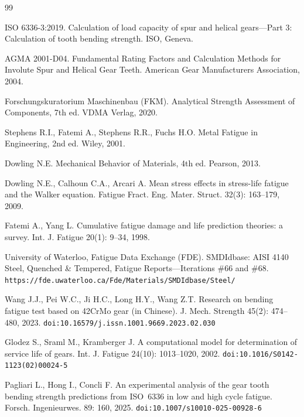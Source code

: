 \documentclass[12pt,a4paper]{article}
\begin{document}
\begin{thebibliography}{99}

ISO 6336-3:2019. Calculation of load capacity of spur and helical
gears---Part 3: Calculation of tooth bending strength. ISO, Geneva.

AGMA 2001-D04. Fundamental Rating Factors and Calculation Methods for
Involute Spur and Helical Gear Teeth. American Gear Manufacturers
Association, 2004.

Forschungskuratorium Maschinenbau (FKM). Analytical Strength Assessment
of Components, 7th ed. VDMA Verlag, 2020.

Stephens R.I., Fatemi A., Stephens R.R., Fuchs H.O. Metal Fatigue in
Engineering, 2nd ed. Wiley, 2001.

Dowling N.E. Mechanical Behavior of Materials, 4th ed. Pearson, 2013.

Dowling N.E., Calhoun C.A., Arcari A. Mean stress effects in
stress-life fatigue and the Walker equation. Fatigue Fract. Eng. Mater.
Struct. 32(3): 163--179, 2009.

Fatemi A., Yang L. Cumulative fatigue damage and life prediction
theories: a survey. Int. J. Fatigue 20(1): 9--34, 1998.

University of Waterloo, Fatigue Data Exchange (FDE). SMDIdbase: AISI
4140 Steel, Quenched \& Tempered, Fatigue Reports---Iterations \#66 and
\#68. \texttt{https://fde.uwaterloo.ca/Fde/Materials/SMDIdbase/Steel/}

Wang J.J., Pei W.C., Ji H.C., Long H.Y., Wang Z.T. Research on bending
fatigue test based on 42CrMo gear (in Chinese). J. Mech. Strength
45(2): 474--480, 2023. \texttt{doi:10.16579/j.issn.1001.9669.2023.02.030}

Glodez S., Sraml M., Kramberger J. A computational model for
determination of service life of gears. Int. J. Fatigue 24(10):
1013--1020, 2002. \texttt{doi:10.1016/S0142-1123(02)00024-5}

Pagliari L., Hong I., Concli F. An experimental analysis of the gear
tooth bending strength predictions from ISO~6336 in low and high cycle
fatigue. Forsch. Ingenieurwes. 89: 160, 2025.
\texttt{doi:10.1007/s10010-025-00928-6}


\end{thebibliography}
\end{document}
